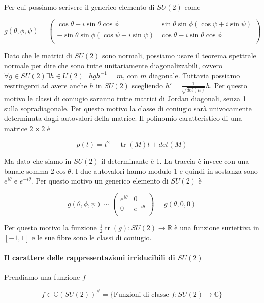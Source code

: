 \documentclass[11pt]{article}
\theoremstyle{plain}
\theoremstyle{definition}
\theoremstyle{remark}
\newcommand{\C}{\mathbb{C}}
\newcommand{\R}{\mathbb{R}}
\DeclareMathOperator{\tr}{tr}
\begin{document}
 Per cui possiamo scrivere il generico elemento di $SU(2)$ come

 \[
 g(\theta, \phi, \psi) =
 \left(
 \begin{array}{cc}
   \cos\theta + i \sin\theta \cos\phi & \sin\theta\sin\phi( \cos\psi + i \sin\psi) \\
   -\sin\theta\sin\phi(\cos\psi - i \sin\psi) & \cos\theta - i \sin\theta\cos\phi  \\

 \end{array}
 \right)
 \]


 Dato che le matrici di $SU(2)$ sono normali, possiamo usare il teorema spettrale normale per dire che sono tutte unitariamente diagonalizzabili, ovvero $\forall g \in SU(2) \exists h \in U(2) \  | \ hgh^{-1} = m$, con $m$ diagonale. Tuttavia possiamo restringerci ad avere anche $h$ in $SU(2)$ scegliendo $h' = \frac{1}{\sqrt{det(h)}} h$. Per questo motivo le classi di coniugio saranno tutte matrici di Jordan diagonali, senza 1 sulla sopradiagonale. Per questo motivo la classe di coniugio sarà univocamente determinata dagli autovalori della matrice. Il polinomio caratteristico di una matrice $2\times 2$ è

 \[ p(t) = t^2 - \tr(M) t + det(M) \]

 Ma dato che siamo in $SU(2)$ il determinante è 1. La traccia è invece con una banale somma $2\cos\theta$. I due autovalori hanno modulo 1 e quindi in sostanza sono $e^{i\theta}$ e $e^{-i\theta}$. Per questo motivo un generico elemento di $SU(2)$ è


 \[
 g(\theta, \phi, \psi) \sim \left(
 \begin{array}{cc}
   e^{i\theta} & 0 \\
   0 & e^{-i\theta} \\
 \end{array}
 \right) = g(\theta, 0 , 0)
 \]




 Per questo motivo la funzione $\frac{1}{2} \tr(g) : SU(2) \to \R$ è una funzione suriettiva in $[-1,1]$ e le sue fibre sono le classi di coniugio.

 \paragraph{Il carattere delle rappresentazioni irriducibili di $SU(2)$}


 Prendiamo una funzione $f$

 \[ f \in \C(SU(2)) ^\# = \{ \text{Funzioni di classe } f: SU(2) \to \C  \} \]
\end{document}
